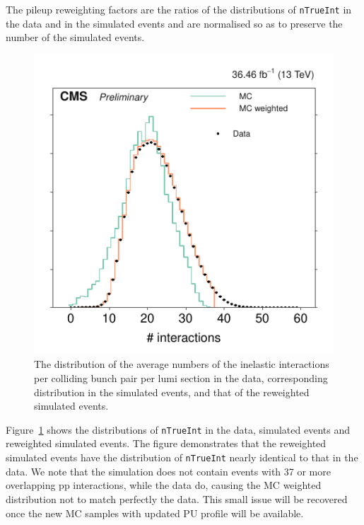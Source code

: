 The pileup reweighting factors are the ratios of the distributions of
\verb!nTrueInt! in the data and in the simulated events and are
normalised so as to preserve the number of the simulated events.

\begin{figure}[!b]
\centering
\includegraphics[scale=1.00]{figures/pileup_reweighting/f044_corr_nTrueInt_data_mc_norm}
\caption{The distribution of the average numbers of the inelastic
interactions per colliding bunch pair per lumi section in the data,
corresponding distribution in the simulated events, and that of the
reweighted simulated events.} \label{f044_corr_nTrueInt_data_mc_norm}
\end{figure}


Figure~\ref{f044_corr_nTrueInt_data_mc_norm} shows the distributions
of \verb!nTrueInt! in the data, simulated events and reweighted
simulated events. The figure demonstrates that the reweighted
simulated events have the distribution of \verb!nTrueInt! nearly
identical to that in the data. 
We note that the simulation does not contain events with 37 or more
overlapping pp interactions, while the data do, causing the MC
weighted distribution not to match perfectly the data. This small
issue will be recovered once the new MC samples with updated PU
profile will be available.



